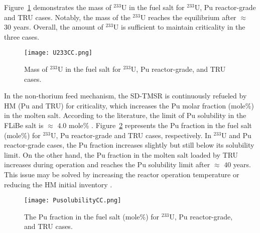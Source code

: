 Figure~\ref{fig:U233CC} demonstrates the mass of $^{233}$U in the fuel salt 
for $^{233}$U, Pu reactor-grade and TRU cases. Notably, the mass of the 
$^{233}$U reaches the equilibrium after $\approx$ $30$ years. Overall, the 
amount of $^{233}$U is sufficient to maintain criticality in 
the three cases.
\begin{figure}
	\centering
	\texttt{[image: U233CC.png]}
	\caption{Mass of $^{233}$U in the fuel salt for $^{233}$U, Pu reactor-grade, and TRU cases.}
	\label{fig:U233CC}
\end{figure}

In the non-thorium feed mechanism, the SD-TMSR is continuously refueled by HM (Pu and TRU) for 
criticality, which increases the Pu molar fraction (mole\%) in the molten salt. 
According to the literature, the limit of Pu solubility in the FLiBe salt is 
$\approx$ $4.0$ mole\% \cite{ignatiev2012progress,sood1975plutonium}. 
Figure~\ref{fig:PusolubilityCC} represents the Pu fraction in the fuel salt 
(mole\%) for $^{233}$U, Pu reactor-grade and TRU cases, respectively. In $^{233}$U and Pu reactor-grade cases, the Pu fraction increases 
slightly but still below its solubility limit. On the other hand, the Pu 
fraction in the molten salt loaded by TRU increases during operation and 
reaches the Pu solubility limit after $\approx$ $40$ years. This issue may 
be solved by increasing the reactor operation temperature or reducing the 
HM initial inventory \cite{zou2018transition}.
\begin{figure}
	\centering
	\texttt{[image: PusolubilityCC.png]}
	\caption{The Pu fraction in the fuel salt (mole\%) for $^{233}$U, Pu reactor-grade, and TRU cases.}
	\label{fig:PusolubilityCC}
\end{figure}
\FloatBarrier

